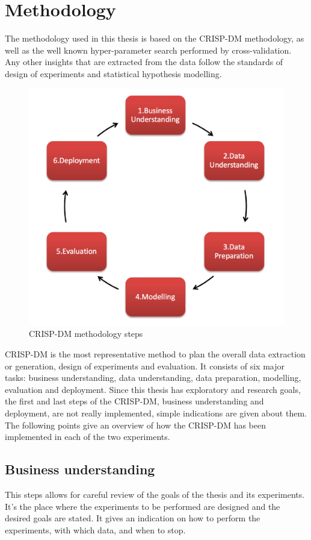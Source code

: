 \newpage
\section{Methodology}

The methodology used in this thesis is based on the CRISP-DM methodology, as well as the well known hyper-parameter search performed by cross-validation. Any other insights that are extracted from the data follow the standards of design of experiments and statistical hypothesis modelling.

\begin{figure}[H]
    \centering
        \includegraphics[width=0.6\linewidth]{img/crisp-dm.png}
    \caption{CRISP-DM methodology steps}\label{fig:crisp}
\end{figure}


CRISP-DM is the most representative method to plan the overall data extraction or generation, design of experiments and evaluation. It consists of six major tasks: business understanding, data understanding, data preparation, modelling, evaluation and deployment. Since this thesis has exploratory and research goals, the first and last steps of the CRISP-DM, business understanding and deployment, are not really implemented, simple indications are given about them. The following points give an overview of how the CRISP-DM has been implemented in each of the two experiments.

\subsection{Business understanding}

This steps allows for careful review of the goals of the thesis and its experiments. It's the place where the experiments to be performed are designed and the desired goals are stated. It gives an indication on how to perform the experiments, with which data, and when to stop.

